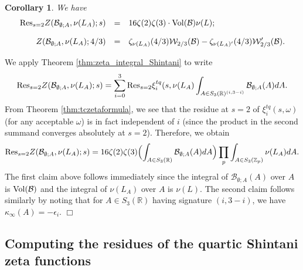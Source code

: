 \documentclass{article}
\def\Z{{\mathbb Z}}
\def\Res{{\rm Res}}
\def\Vol{{\rm Vol}}
\def\R{{\mathbb R}}
\def\cB{{\mathcal B}}
\def\Z{{\mathbb Z}}
\newtheorem{corollary}[theorem]{Corollary}
\newenvironment{proof}{\noindent {\bf Proof:}}{$\Box$ \vspace{2 ex}}
\begin{document}
\begin{corollary}\label{cor:special_value}
We have
\begin{equation*}
\begin{array}{rcl}
\Res_{s=2}Z(\cB_{\emptyset;A},\nu(L_A);s)&=&\displaystyle
16\zeta(2)\zeta(3)\cdot\Vol(\cB)\nu(L);
\\[.15in]
Z(\cB_{\emptyset;A},\nu(L_A);4/3)&=&\displaystyle 
\zeta_{\nu(L_A)}(4/3)\mathcal W_{2/3}(\cB)
-
\zeta_{\nu(L_A)'}(4/3)\mathcal W_{2/3}'(\cB).
\end{array}
\end{equation*}
\end{corollary}
\begin{proof}
We apply Theorem \ref{thm:zeta_integral_Shintani} to write
\begin{equation*}
\Res_{s=2}Z(\cB_{\emptyset;A},\nu(L_A);s)=\sum_{i=0}^3\Res_{s=2}\xi_i^{tq}(s,\nu(L_A)\int_{A\in S_3(\R)^{(i,3-i)}}\cB_{\emptyset;A}(A)dA.
\end{equation*}
From Theorem \ref{thm:tczetaformula}, we see that the residue at $s=2$ of $\xi_i^{tq}(s,\omega)$ (for any acceptable $\omega$) is in fact independent of $i$ (since the product in the second summand converges absolutely at $s=2$). Therefore, we obtain
\begin{equation*}
\Res_{s=2}Z(\cB_{\emptyset;A},\nu(L_A);s)=
16\zeta(2)\zeta(3)\Bigl(\int_{A\in S_3(\R)}\cB_{\emptyset;A}(A)dA\Bigr)\prod_p\int_{A\in S_3(\Z_p)}\nu(L_A)dA.
\end{equation*}
The first claim above follows immediately since the integral of $\cB_{\emptyset;A}(A)$ over $A$ is $\Vol(\cB)$ and the integral of $\nu(L_A)$ over $A$ is $\nu(L)$. The second claim follows similarly by noting that for $A\in S_3(\R)$ having signature $(i,3-i)$, we have $\kappa_\infty(A)=-\epsilon_i$.
\end{proof}

\subsection{Computing the residues of the quartic Shintani zeta functions}
\end{document}
